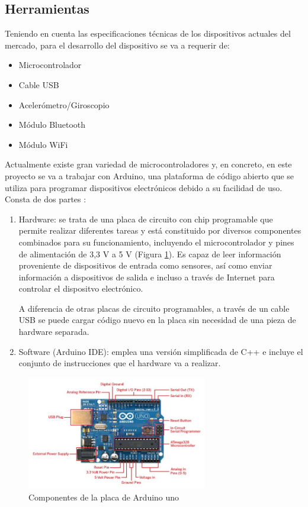 \subsection{Herramientas}

Teniendo en cuenta las especificaciones técnicas de los dispositivos actuales del mercado, para el desarrollo del dispositivo se va a requerir de:
\begin{itemize}
    \item Microcontrolador
    \item Cable USB
    \item Acelerómetro/Giroscopio
    \item Módulo Bluetooth
    \item Módulo WiFi
\end{itemize}

Actualmente existe gran variedad de microcontroladores y, en concreto, en este proyecto se va a trabajar con Arduino, una plataforma de código abierto que se utiliza para programar dispositivos electrónicos debido a su facilidad de uso. Consta de dos partes \cite{badamasi2014working}:  
\begin{enumerate}
    \item Hardware: se trata de una placa de circuito con chip programable que permite realizar diferentes tareas y está constituido por diversos componentes combinados para su funcionamiento, incluyendo el microcontrolador y pines de alimentación de 3,3 V a 5 V (Figura \ref{fig:placa-arduino}). Es capaz de leer información proveniente de dispositivos de entrada como sensores, así como enviar información a dispositivos de salida e incluso a través de Internet para controlar el dispositvo electrónico.
    
    A diferencia de otras placas de circuito programables, a través de un cable USB se puede cargar código nuevo en la placa sin necesidad de una pieza de hardware separada.
    
    \item Software (Arduino IDE): emplea una versión simplificada de C++ e incluye el conjunto de instrucciones que el hardware va a realizar.
\end{enumerate}

 \begin{figure}[ht]
    \centering
    \includegraphics[width=0.7\textwidth]{img/arduino.jpg}
    \caption{Componentes de la placa de Arduino uno \cite{website:aprendiendoarduino.wordpress} }
    \label{fig:placa-arduino}
 \end{figure}


